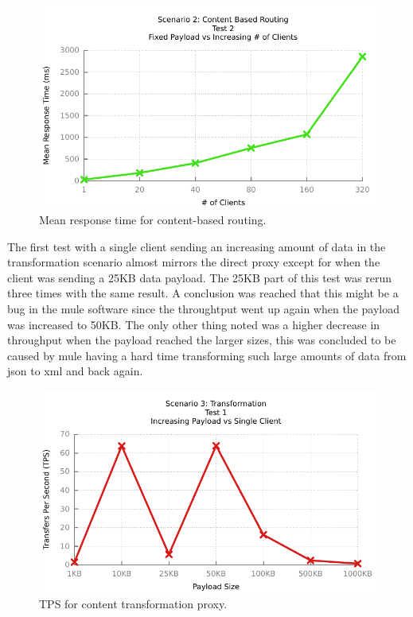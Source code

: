\begin{figure}[htpb]
	\centerline{\includegraphics{img/mediation_fp_iu_resp}}
	\caption{Mean response time for content-based routing.}
	\label{fig:mediation-2-2}
\end{figure}

The first test with a single client sending an increasing amount of data in the transformation scenario almost mirrors the direct proxy except for when the client was sending a 25KB data payload. The 25KB part of this test was rerun three times with the same result.
A conclusion was reached that this might be a bug in the mule software since the throughtput went up again when the payload was increased to 50KB.
The only other thing noted was a higher decrease in throughput when the payload reached the larger sizes, this was concluded to be caused by mule having a hard time transforming such large amounts of data from json to xml and back again.

\begin{figure}[htpb]
	\centerline{\includegraphics{img/transform_fu_ip_tps}}
	\caption{TPS for content transformation proxy.}
	\label{fig:transform-1-1}
\end{figure}

